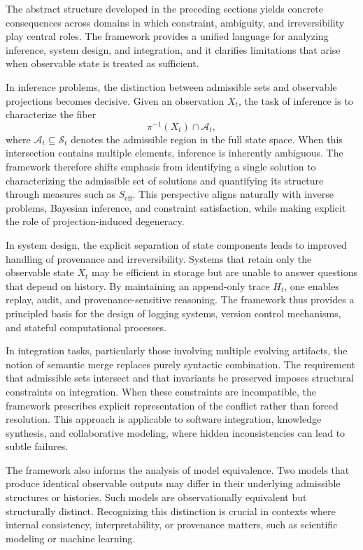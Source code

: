 \documentclass[11pt,oneside]{article}
\begin{document}
The abstract structure developed in the preceding sections yields concrete consequences across domains in which constraint, ambiguity, and irreversibility play central roles. The framework provides a unified language for analyzing inference, system design, and integration, and it clarifies limitations that arise when observable state is treated as sufficient.

In inference problems, the distinction between admissible sets and observable projections becomes decisive. Given an observation \( X_t \), the task of inference is to characterize the fiber
\[
\pi^{-1}(X_t) \cap \mathcal{A}_t,
\]
where \( \mathcal{A}_t \subseteq \mathcal{S}_t \) denotes the admissible region in the full state space. When this intersection contains multiple elements, inference is inherently ambiguous. The framework therefore shifts emphasis from identifying a single solution to characterizing the admissible set of solutions and quantifying its structure through measures such as \( S_{\mathrm{eff}} \). This perspective aligns naturally with inverse problems, Bayesian inference, and constraint satisfaction, while making explicit the role of projection-induced degeneracy.

In system design, the explicit separation of state components leads to improved handling of provenance and irreversibility. Systems that retain only the observable state \( X_t \) may be efficient in storage but are unable to answer questions that depend on history. By maintaining an append-only trace \( H_t \), one enables replay, audit, and provenance-sensitive reasoning. The framework thus provides a principled basis for the design of logging systems, version control mechanisms, and stateful computational processes.

In integration tasks, particularly those involving multiple evolving artifacts, the notion of semantic merge replaces purely syntactic combination. The requirement that admissible sets intersect and that invariants be preserved imposes structural constraints on integration. When these constraints are incompatible, the framework prescribes explicit representation of the conflict rather than forced resolution. This approach is applicable to software integration, knowledge synthesis, and collaborative modeling, where hidden inconsistencies can lead to subtle failures.

The framework also informs the analysis of model equivalence. Two models that produce identical observable outputs may differ in their underlying admissible structures or histories. Such models are observationally equivalent but structurally distinct. Recognizing this distinction is crucial in contexts where internal consistency, interpretability, or provenance matters, such as scientific modeling or machine learning.
\end{document}

